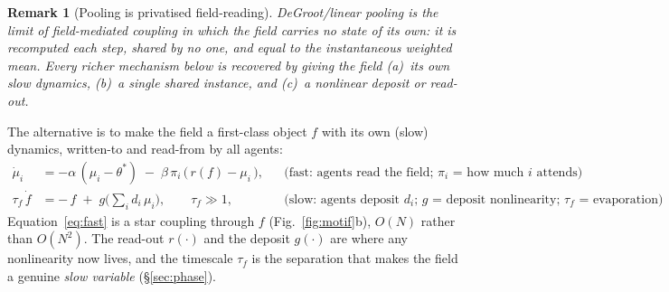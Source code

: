 \documentclass[11pt,a4paper]{article}
\theoremstyle{plain}
\newtheorem{remark}{Remark}
\begin{document}
\begin{remark}[Pooling is privatised field-reading]
DeGroot/linear pooling is the limit of field-mediated coupling in which the
field carries no state of its own: it is recomputed each step, shared by no
one, and equal to the instantaneous weighted mean. Every richer mechanism
below is recovered by giving the field \emph{(a)}~its own slow dynamics,
\emph{(b)}~a single shared instance, and \emph{(c)}~a nonlinear deposit or
read-out.
\end{remark}

The alternative is to make the field a first-class object $f$ with its own
(slow) dynamics, written-to and read-from by all agents:
\begin{align}
\dot\mu_i &= -\alpha\,(\mu_i-\theta^\ast) \;-\;\beta\,\pi_i\,\big(\,r(f) - \mu_i\,\big),
  && \text{(fast: agents read the field; $\pi_i$ = how much $i$ attends)}
  \label{eq:fast}\\
\tau_f\,\dot f &= -\,f \;+\; g\!\Big(\textstyle\sum_i d_i\,\mu_i\Big),
  \qquad \tau_f \gg 1,
  && \text{(slow: agents deposit $d_i$; $g$ = deposit nonlinearity; $\tau_f$ = evaporation)}
  \label{eq:slow}
\end{align}
Equation~\eqref{eq:fast} is a star coupling through $f$ (Fig.~\ref{fig:motif}b),
$O(N)$ rather than $O(N^2)$. The read-out $r(\cdot)$ and the deposit $g(\cdot)$
are where any nonlinearity now lives, and the timescale $\tau_f$ is the
separation that makes the field a genuine \emph{slow variable}
(\S\ref{sec:phase}).
\end{document}
